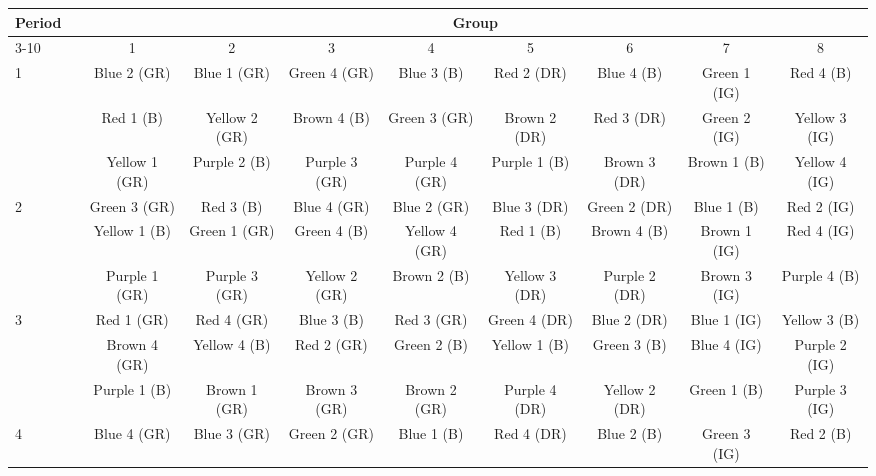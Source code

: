 
%


\begin{tabular}{lc*{8}c}
  \toprule
  \multirow{3}{*}{Period}	&	&	\multicolumn{8}{c}{Group}	\\
  \cmidrule{3-10}
  	&	&	1	&	2	&	3	&	4	&	5	&	6	&	7	&	8	\\
  	\midrule
	\multirow{3}{*}{1}	&	&	Blue	2	(GR)	&	Blue 1 (GR)	&	Green 4 (GR)	&	Blue 3 (B)		&	Red 2 (DR)	&	Blue 4 (B)		&	Green 1 (IG)	&	Red 4 (B)	\\
		&	&	Red 1 (B)	&	Yellow 2 (GR)	&	Brown 4 (B)	&	Green 3 (GR)	&	Brown 2 (DR)	&	Red 3 (DR)	&	Green 2 (IG)	&	Yellow 3 (IG)	\\
		&	&	Yellow 1 (GR)	&	Purple 2 (B)	&	Purple 3 (GR)	&	Purple 4 (GR)	&	Purple 1 (B)	&	Brown 3 (DR)	&	Brown 1 (B)	&	Yellow 4 (IG)	\\
	\midrule
	\multirow{3}{*}{2}	&	&	Green 3 (GR)	&	Red 3 (B)	&	Blue 4 (GR)	&	Blue 2 (GR)	&	Blue 3 (DR)	&	Green 2 (DR)	&	Blue 1 (B)		&	Red 2 (IG)	\\
	&	&	Yellow 1 (B)	&	Green 1 (GR)	&	Green 4 (B)	&	Yellow 4 (GR)	&	Red 1 (B)	&	Brown 4 (B)	&	Brown 1 (IG)	&	Red 4 (IG)	\\
	&	&	Purple 1 (GR)	&	Purple 3 (GR)	&	Yellow 2 (GR)	&	Brown 2 (B)	&	Yellow 3 (DR)	&	Purple 2 (DR)	&	Brown 3 (IG)	&	Purple 4 (B)	\\
	\midrule
	\multirow{3}{*}{3}	&	&	Red 1 (GR)	&	Red 4 (GR)	&	Blue 3 (B)		&	Red 3 (GR)	&	Green 4 (DR)	&	Blue 2 (DR)	&	Blue 1 (IG)	&	Yellow 3 (B)	\\
	&	&	Brown 4 (GR)	&	Yellow 4 (B)	&	Red 2 (GR)	&	Green 2 (B)	&	Yellow 1 (B)	&	Green 3 (B)	&	Blue 4 (IG)	&	Purple 2 (IG)	\\
	&	&	Purple 1 (B)	&	Brown 1 (GR)	&	Brown 3 (GR)	&	Brown 2 (GR)	&	Purple 4 (DR)	&	Yellow 2 (DR)	&	Green 1 (B)	&	Purple 3 (IG)	\\
	\midrule
	\multirow{3}{*}{4}	&	&	Blue 4 (GR)	&	Blue 3 (GR)	&	Green 2 (GR)	&	Blue 1 (B)		&	Red 4 (DR)	&	Blue 2 (B)		&	Green 3 (IG)	&	Red 2 (B)	\\

\end{tabular}
